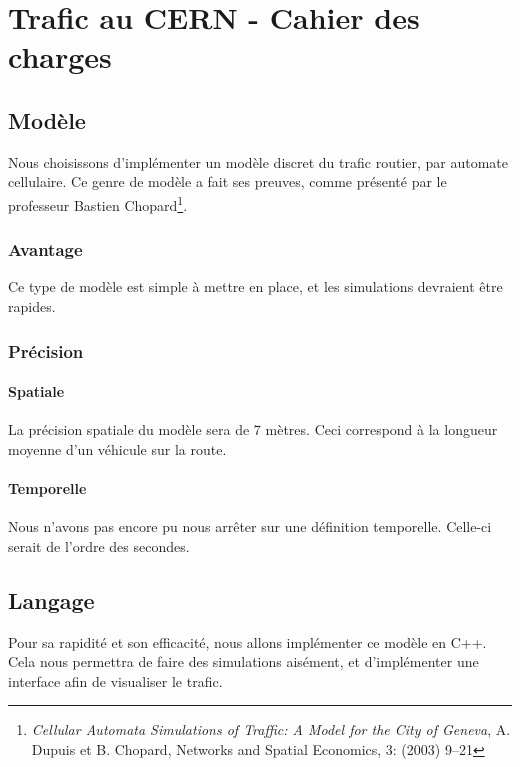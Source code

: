 \documentclass[a4paper,10pt]{extarticle}
\begin{document}
\pagestyle{fancy}
\renewcommand{\headheight}{24pt}
\rhead{\today}

\section*{Trafic au CERN - Cahier des charges}

\subsection*{Modèle}

Nous choisissons d'implémenter un modèle discret du trafic routier, par automate cellulaire. Ce genre de modèle a fait ses preuves, comme présenté par le professeur Bastien Chopard\footnote{\emph{Cellular Automata Simulations of Traffic:
A Model for the City of Geneva}, A. Dupuis et B. Chopard, Networks and Spatial Economics, 3: (2003) 9–21}.

\subsubsection*{Avantage}

Ce type de modèle est simple à mettre en place, et les simulations devraient être rapides.

\subsubsection*{Précision}

\paragraph{Spatiale}

La précision spatiale du modèle sera de 7 mètres. Ceci correspond à la longueur moyenne d'un véhicule sur la route.

\paragraph{Temporelle}

Nous n'avons pas encore pu nous arrêter sur une définition temporelle. Celle-ci serait de l'ordre des secondes.

\subsection*{Langage}

Pour sa rapidité et son efficacité, nous allons implémenter ce modèle en C++. Cela nous permettra de faire des simulations aisément, et d'implémenter une interface afin de visualiser le trafic.
\end{document}

